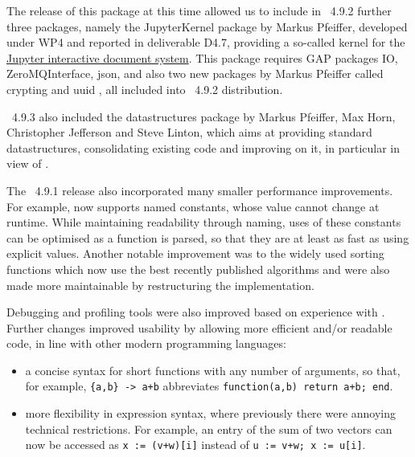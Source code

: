 \documentclass{deliverablereport}
\begin{document}

The release of this package at this time allowed us to include in \GAP~4.9.2
further three packages, namely the {\sf JupyterKernel} package \cite{JupyterKernel} 
by Markus Pfeiffer, developed under WP4 and reported in deliverable D4.7,
providing a so-called kernel for the
\href{https://jupyter.org/}{Jupyter interactive document system}. This package
requires GAP packages {\sf IO}, {\sf ZeroMQInterface}, {\sf json},
and also two new packages by Markus Pfeiffer called
{\sf crypting} and {\sf uuid} \cite{crypting,uuid}, all included 
into \GAP~4.9.2 distribution.

\GAP~4.9.3 also included the {\sf datastructures} package \cite{datastructures}
by Markus Pfeiffer, Max Horn, Christopher Jefferson and Steve Linton, which aims 
at providing standard datastructures, consolidating existing code and improving 
on it, in particular in view of \HPCGAP.

The \GAP~4.9.1 release also incorporated many smaller performance improvements. For example,
\GAP now supports named constants, whose value cannot change 
at runtime. While maintaining readability through naming, uses of
these constants can be optimised as a function is parsed, so that they
are at least as fast as using explicit values. Another notable improvement was
to the widely used  sorting functions which now use the best
recently published algorithms and were also made more maintainable by
restructuring the implementation.

Debugging  and profiling tools were also improved based on experience with
. Further changes improved \GAP
usability by allowing more efficient and/or readable code, in line
with other modern programming languages:
\begin{itemize}
  \item a concise syntax for short
    functions with any number of arguments, so that, for example,
    \verb|{a,b} -> a+b| abbreviates \verb|function(a,b) return a+b; end|. 
\item more flexibility in \GAP expression syntax,
  where previously there were annoying technical restrictions. For
  example, an entry of the sum of two vectors can now be accessed as
  \verb|x := (v+w)[i]| instead of \verb|u := v+w; x := u[i]|.
  

\end{itemize}
\end{document}
